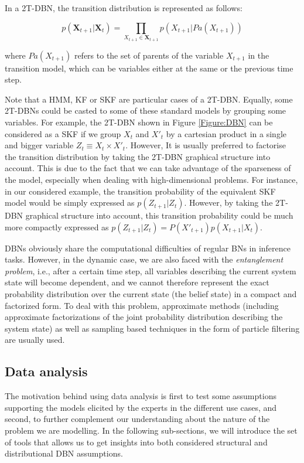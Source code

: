 In a 2T-DBN, the transition distribution is represented as follows:

$$ p(\bm X_{t+1} | \bm X_t) = \prod_{X_{t+1}\in\bm X_{t+1}} p(X_{t+1}|Pa(X_{t+1}))$$ 

\noindent where $Pa(X_{t+1})$ refers to the set of parents of the variable $X_{t+1}$ in the transition model, which can be variables either at the same or the previous time step. 

Note that a HMM, KF or SKF are particular cases of a 2T-DBN. Equally, some 2T-DBNs could be casted to some of these standard models by grouping some variables. For example, the 2T-DBN shown in Figure \ref{Figure:DBN} can be considered as a SKF if we group $X_t$ and $X'_t$ by a cartesian product in a single and bigger variable $Z_t \equiv X_t \times X'_t $. However, It is usually preferred to factorise the transition distribution by taking the 2T-DBN graphical structure into account. This is due to the fact that we can take advantage of the sparseness of the model, especially when dealing with high-dimensional problems. For instance, in our considered example, the transition probability of the equivalent SKF model would be simply expressed as $p(Z_{t+1}|Z_t)$. However, by taking the 2T-DBN graphical structure into account, this transition probability could be much more compactly expressed as $p(Z_{t+1}|Z_t)=P(X'_{t+1})p(X_{t+1}|X_t)$.

DBNs obviously share the computational difficulties of regular BNs in inference tasks. However, in the dynamic case, we are also faced with the \textit{entanglement problem}, i.e., after a certain time step, all variables describing the current system state will become dependent, and we cannot therefore represent the exact probability distribution over the current state (the belief state) in a compact and factorized form. To deal with this problem, approximate methods (including approximate factorizations of the joint probability distribution describing the system state) \cite{BoyenKoller1998} as well as sampling based techniques in the form of particle filtering \cite{Doucet2000} are usually used.


\subsection{Data analysis}\label{SubSection:DataAnalysis}

The motivation behind using data analysis is first to test some assumptions supporting the models elicited by the experts in the different use cases, and second, to further complement our understanding about the nature of the problem we are modelling. In the following sub-sections, we will introduce the set of tools that allows us to get insights into both considered structural and distributional DBN assumptions.

